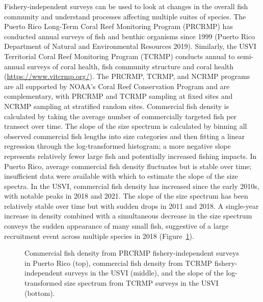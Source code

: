 \documentclass[
  letterpaper,
  oneside,
  open=any]{scrbook}
\begin{document}
Fishery-independent surveys can be used to look at changes in the
overall fish community and understand processes affecting multiple
suites of species. The Puerto Rico Long-Term Coral Reef Monitoring
Program (PRCRMP) has conducted annual surveys of fish and benthic
organisms since 1999 (Puerto Rico Department of Natural and
Environmental Resources 2019). Similarly, the USVI Territorial Coral
Reef Monitoring Program (TCRMP) conducts annual to semi-annual surveys
of coral health, fish community structure and coral health
(\href{https://www.google.com/url?q=https://www.vitcrmp.org/&sa=D&source=docs&ust=1733763590069103&usg=AOvVaw2nwqg9fhvdZ3k4tlJFQWV2}{https://www.vitcrmp.org/}).
The PRCRMP, TCRMP, and NCRMP programs are all supported by NOAA's Coral
Reef Conservation Program and are complementary, with PRCRMP and TCRMP
sampling at fixed sites and NCRMP sampling at stratified random sites.
Commercial fish density is calculated by taking the average number of
commercially targeted fish per transect over time. The slope of the size
spectrum is calculated by binning all observed commercial fish lengths
into size categories and then fitting a linear regression through the
log-transformed histogram; a more negative slope represents relatively
fewer large fish and potentially increased fishing impacts. In Puerto
Rico, average commercial fish density fluctuates but is stable over
time; insufficient data were available with which to estimate the slope
of the size spectra. In the USVI, commercial fish density has increased
since the early 2010s, with notable peaks in 2018 and 2021. The slope of
the size spectrum has been relatively stable over time but with sudden
drops in 2011 and 2018. A single-year increase in density combined with
a simultaneous decrease in the size spectrum conveys the sudden
appearance of many small fish, suggestive of a large recruitment event
across multiple species in 2018 (Figure~\ref{fig-fishdensity}).

\begin{figure}


\caption{\label{fig-fishdensity}Commercial fish density from PRCRMP
fishery-independent surveys in Puerto Rico (top), commercial fish
density from TCRMP fishery-independent surveys in the USVI (middle), and
the slope of the log-transformed size spectrum from TCRMP surveys in the
USVI (bottom).}

\end{figure}%
\end{document}
